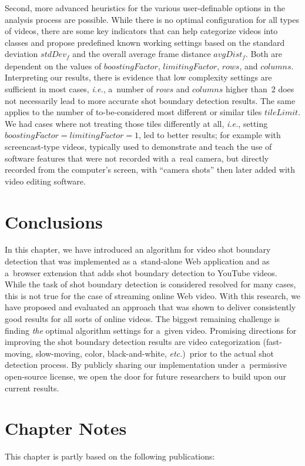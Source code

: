 Second, more advanced heuristics for the various user-definable
options in the analysis process are possible.
While there is no optimal configuration for all types of videos,
there are some key indicators that can help categorize videos
into classes and propose predefined known working settings
based on the standard deviation $\mathit{stdDev_{f}}$
and the overall average frame distance $\mathit{avgDist_{f}}$.
Both are dependent on the values of $\mathit{boostingFactor}$,
$\mathit{limitingFactor}$, $\mathit{rows}$, and $\mathit{columns}$. 
Interpreting our results, there is evidence
that low complexity settings are sufficient in most cases,
\emph{i.e.}, a~number of $\mathit{rows}$ and $\mathit{columns}$
higher than~$\mathit{2}$ does not necessarily
lead to more accurate shot boundary detection results.
The same applies to the number of to-be-considered most different
or similar tiles $\mathit{tileLimit}$.
We had cases where not treating those tiles differently
at all, \emph{i.e.}, setting
$\mathit{boostingFactor} = \mathit{limitingFactor} = \mathit{1}$, 
led to better results; for example with screencast-type videos,
typically used to demonstrate and teach the use of software features
that were not recorded with a~real camera,
but directly recorded from the computer's screen, with ``camera shots''
then later added with video editing software.

\section{Conclusions}

In this chapter, we have introduced an algorithm for video shot boundary detection
that was implemented as a~stand-alone Web application
and as a~browser extension that adds shot boundary detection to YouTube videos.
While the task of shot boundary detection is considered resolved for many cases,
this is not true for the case of streaming online Web video.
With this research, we have proposed and evaluated an approach
that was shown to deliver consistently good results for all sorts of online videos.
The biggest remaining challenge is finding \emph{the} optimal algorithm settings
for a~given video.
Promising directions for improving the shot boundary detection results
are video categorization (fast-moving, slow-moving, color, black-and-white, \emph{etc.})\ prior
to the actual shot detection process.
By publicly sharing our implementation under a~permissive open-source license,
we open the door for future researchers to build upon our current results.

\section*{Chapter Notes}
This chapter is partly based on the following publications:


\clearpage

